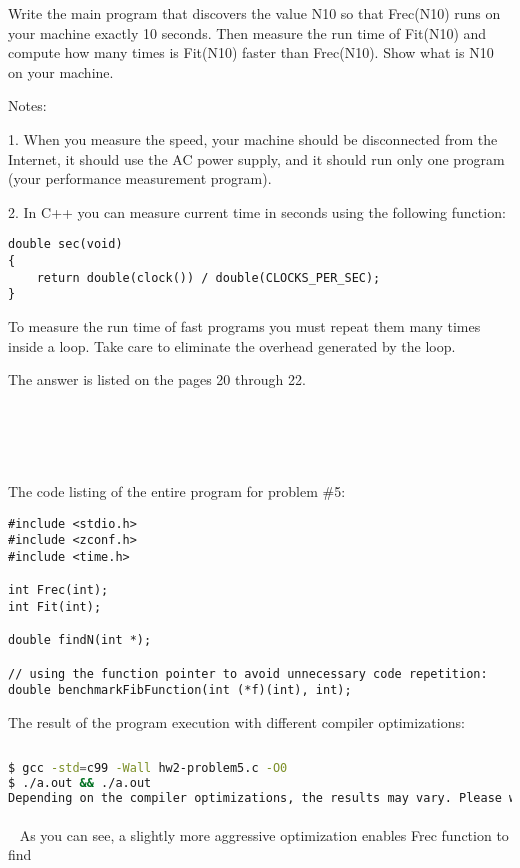 \documentclass{article}
\begin{document}
		Write the main program that discovers the value N10 so that Frec(N10) runs on your machine exactly 10 seconds. Then measure the run time of Fit(N10) and compute how many times is Fit(N10) faster than Frec(N10). Show what is N10 on your machine.
		\newline
		
		\noindent Notes:
		
		1. When you measure the speed, your machine should be disconnected from the Internet, it should use the AC power supply, and it should run only one program (your performance measurement program).
		
		2. In C++ you can measure current time in seconds using the following function:
		
		\begin{verbatim}
double sec(void)
{
    return double(clock()) / double(CLOCKS_PER_SEC);
}
		\end{verbatim}
		
		To measure the run time of fast programs you must repeat them many times inside a loop. Take care to eliminate the overhead generated by the loop.
		\newline
		
		The answer is listed on the pages 20 through 22.

\paragraph{}\
\paragraph{}\



		\noindent The code listing of the entire program for problem \#5: 
		\begin{verbatim}
#include <stdio.h>
#include <zconf.h>
#include <time.h>

int Frec(int);
int Fit(int);

double findN(int *);

// using the function pointer to avoid unnecessary code repetition:
double benchmarkFibFunction(int (*f)(int), int);

		\end{verbatim}
		
		
	\rmfamily
	\noindent The result of the program execution with different compiler optimizations:
	
	\ttfamily
	\begin{lstlisting}[language=bash]
	
$ gcc -std=c99 -Wall hw2-problem5.c -O0
$ ./a.out && ./a.out
Depending on the compiler optimizations, the results may vary. Please wait...

	\end{lstlisting}
	

	\paragraph{}\
	\rmfamily
	As you can see, a slightly more aggressive optimization enables Frec function to find
		
\end{document}

